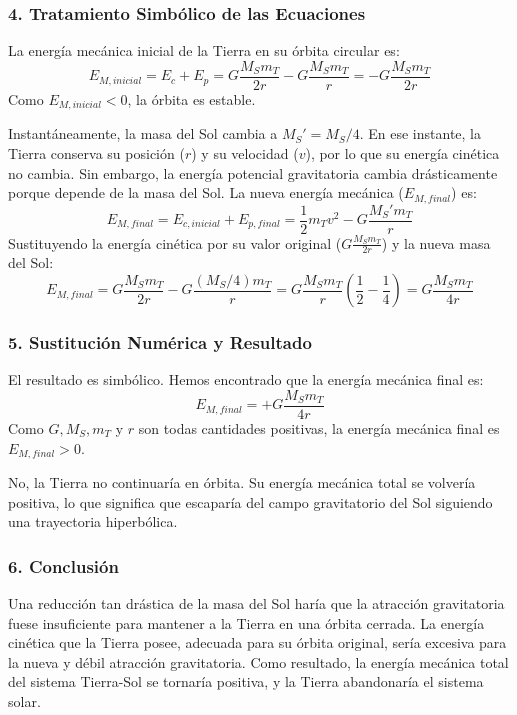 \subsubsection*{4. Tratamiento Simbólico de las Ecuaciones}
La energía mecánica inicial de la Tierra en su órbita circular es:
$$E_{M, inicial} = E_c + E_p = G \frac{M_S m_T}{2r} - G \frac{M_S m_T}{r} = - G \frac{M_S m_T}{2r}$$
Como $E_{M, inicial} < 0$, la órbita es estable.

Instantáneamente, la masa del Sol cambia a $M_S' = M_S/4$. En ese instante, la Tierra conserva su posición ($r$) y su velocidad ($v$), por lo que su energía cinética no cambia. Sin embargo, la energía potencial gravitatoria cambia drásticamente porque depende de la masa del Sol. La nueva energía mecánica ($E_{M, final}$) es:
$$E_{M, final} = E_{c, inicial} + E_{p, final} = \frac{1}{2}m_T v^2 - G \frac{M_S' m_T}{r}$$
Sustituyendo la energía cinética por su valor original ($G \frac{M_S m_T}{2r}$) y la nueva masa del Sol:
$$E_{M, final} = G \frac{M_S m_T}{2r} - G \frac{(M_S/4) m_T}{r} = G \frac{M_S m_T}{r} \left(\frac{1}{2} - \frac{1}{4}\right) = G \frac{M_S m_T}{4r}$$

\subsubsection*{5. Sustitución Numérica y Resultado}
El resultado es simbólico. Hemos encontrado que la energía mecánica final es:
$$E_{M, final} = + G \frac{M_S m_T}{4r}$$
Como $G, M_S, m_T$ y $r$ son todas cantidades positivas, la energía mecánica final es $E_{M, final} > 0$.
\begin{cajaresultado}
No, la Tierra no continuaría en órbita. Su energía mecánica total se volvería positiva, lo que significa que escaparía del campo gravitatorio del Sol siguiendo una trayectoria hiperbólica.
\end{cajaresultado}

\subsubsection*{6. Conclusión}
\begin{cajaconclusion}
Una reducción tan drástica de la masa del Sol haría que la atracción gravitatoria fuese insuficiente para mantener a la Tierra en una órbita cerrada. La energía cinética que la Tierra posee, adecuada para su órbita original, sería excesiva para la nueva y débil atracción gravitatoria. Como resultado, la energía mecánica total del sistema Tierra-Sol se tornaría positiva, y la Tierra abandonaría el sistema solar.
\end{cajaconclusion}

